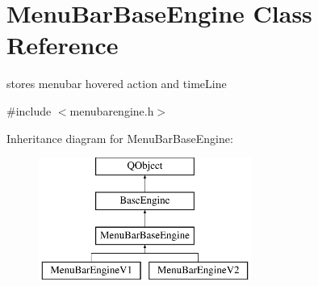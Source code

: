 \hypertarget{class_menu_bar_base_engine}{}\section{Menu\+Bar\+Base\+Engine Class Reference}
\label{class_menu_bar_base_engine}


stores menubar hovered action and time\+Line  




{\ttfamily \#include $<$menubarengine.\+h$>$}

Inheritance diagram for Menu\+Bar\+Base\+Engine\+:\begin{figure}[H]
\begin{center}
\leavevmode
\includegraphics[height=4.000000cm]{class_menu_bar_base_engine}
\end{center}
\end{figure}
